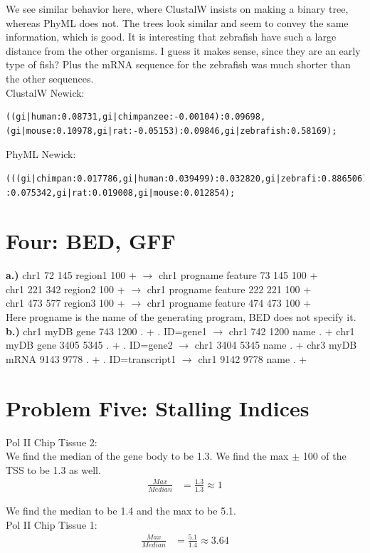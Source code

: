 \documentclass[10pt]{article} %
\begin{document}
We see similar behavior here, where ClustalW insists on making a binary tree,
whereas PhyML does not. The trees look similar and seem to convey the same
information, which is good. It is interesting that zebrafish have such a
large distance from the other organisms. I guess it makes sense, since they
are an early type of fish? Plus the mRNA sequence for the zebrafish was much shorter
than the other sequences.\\

ClustalW Newick:
\begin{verbatim}
((gi|human:0.08731,gi|chimpanzee:-0.00104):0.09698,
(gi|mouse:0.10978,gi|rat:-0.05153):0.09846,gi|zebrafish:0.58169);
\end{verbatim}

PhyML Newick:
\begin{verbatim}
(((gi|chimpan:0.017786,gi|human:0.039499):0.032820,gi|zebrafi:0.886506)
:0.075342,gi|rat:0.019008,gi|mouse:0.012854);
\end{verbatim}

\section{Four: BED, GFF}

\textbf{a.)}
chr1 72 145 region1 100 + $\rightarrow$ chr1 progname feature 73 145 100 +\\
chr1 221 342 region2 100 + $\rightarrow$ chr1 progname feature 222 221 100 +\\
chr1 473 577 region3 100 + $\rightarrow$ chr1 progname feature 474 473 100 +\\

Here progname is the name of the generating program, BED does not specify it.\\

\textbf{b.)}
chr1 myDB gene 743 1200 . + . ID=gene1 $\rightarrow$ chr1 742 1200 name . +
chr1 myDB gene 3405 5345 . + . ID=gene2 $\rightarrow$ chr1 3404 5345 name . +
chr3 myDB mRNA 9143 9778 . + . ID=transcript1 $\rightarrow$ chr1 9142 9778 name . +

\section{Problem Five: Stalling Indices}

Pol II Chip Tissue 2:\\
We find the median of the gene body to be 1.3. We find the max $\pm$ 100 of the TSS
to be 1.3 as well.\\
\begin{align*}
  \frac{Max}{Median} &= \frac{1.3}{1.3} \approx 1
\end{align*}


We find the median to be 1.4 and the max to be 5.1.\\
Pol II Chip Tissue 1:\\
\begin{align*}
  \frac{Max}{Median} &= \frac{5.1}{1.4} \approx 3.64
\end{align*}
\end{document}
